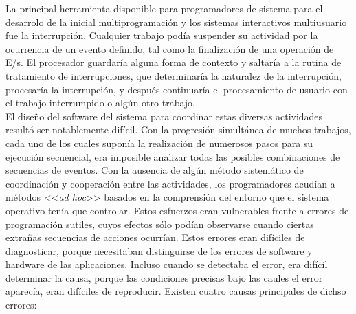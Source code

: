 \documentclass{article}
\begin{document}
				La principal herramienta disponible para programadores de sistema para el desarrolo de la inicial multiprogramación y los sistemas interactivos multiusuario fue la interrupción. Cualquier trabajo podía suspender su actividad por la ocurrencia de un evento definido, tal como la finalización de una operación de E/s. El procesador guardaría alguna forma de contexto y saltaría a la rutina de tratamiento de interrupciones, que determinaría la naturalez de la interrupción, procesaría la interrupción, y después continuaría el procesamiento de usuario con el trabajo interrumpido o algún otro trabajo. \\
				
				El diseño del software del sistema para coordinar estas diversas actividades resultó ser notablemente difícil. Con la progresión simultánea de muchos trabajos, cada uno de los cuales suponía la realización de numerosos pasos para su ejecución secuencial, era imposible analizar todas las posibles combinaciones de secuencias de eventos. Con la ausencia de algún método sistemático de coordinación y cooperación entre las actividades, los programadores acudían a métodos <<\textit{ad hoc}>> basados en la comprensión del entorno que el sistema operativo tenía que controlar. Estos esfuerzos eran vulnerables frente a errores de programación sutiles, cuyos efectos sólo podían observarse cuando ciertas extrañas secuencias de acciones ocurrían. Estos errores eran difíciles de diagnosticar, porque necesitaban distinguirse de los errores de software y hardware de las aplicaciones. Incluso cuando se detectaba el error, era difícil determinar la causa, porque las condiciones precisas bajo las caules el error aparecía, eran difíciles de reproducir. Existen cuatro causas principales de dichso errores:
				
\end{document}
